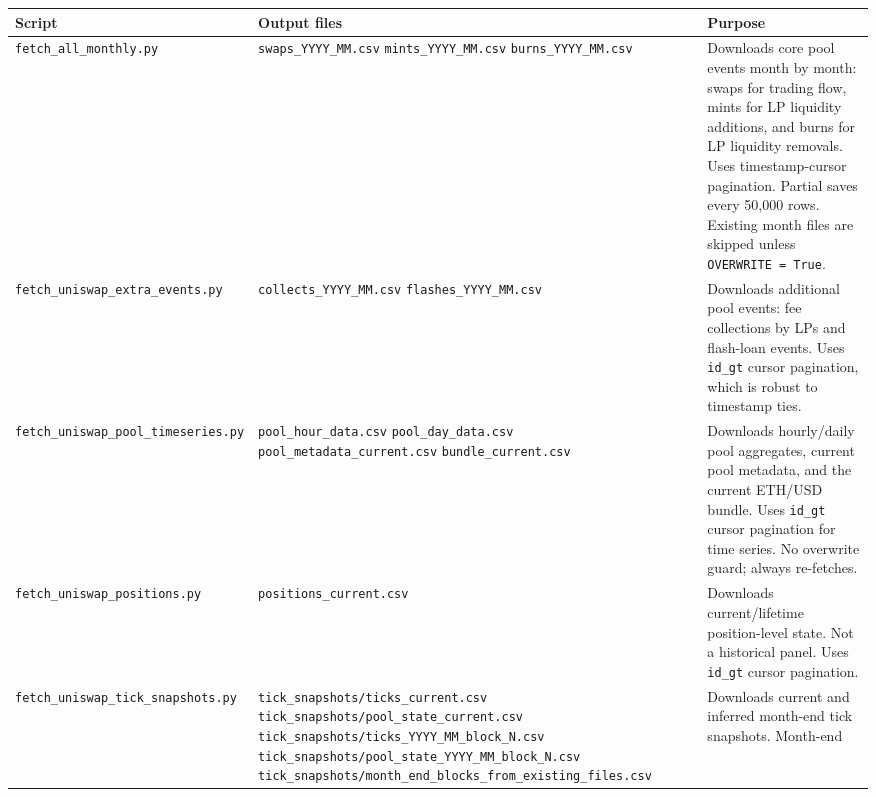 \documentclass[11pt,a4paper]{article}
\begin{document}
\begin{xltabular}{\linewidth}{L{4.5cm}L{4.0cm}Y}
\toprule
\textbf{Script} & \textbf{Output files} & \textbf{Purpose} \\
\midrule
\texttt{fetch\_all\_monthly.py}
  & \texttt{swaps\_YYYY\_MM.csv} \newline
    \texttt{mints\_YYYY\_MM.csv} \newline
    \texttt{burns\_YYYY\_MM.csv}
  & Downloads core pool events month by month: swaps for trading flow,
    mints for LP liquidity additions, and burns for LP liquidity removals.
    Uses timestamp-cursor pagination. Partial saves every 50{,}000 rows.
    Existing month files are skipped unless \texttt{OVERWRITE = True}. \\
\addlinespace
\texttt{fetch\_uniswap\_extra\_events.py}
  & \texttt{collects\_YYYY\_MM.csv} \newline
    \texttt{flashes\_YYYY\_MM.csv}
  & Downloads additional pool events: fee collections by LPs and
    flash-loan events. Uses \texttt{id\_gt} cursor pagination, which
    is robust to timestamp ties. \\
\addlinespace
\texttt{fetch\_uniswap\_pool\_timeseries.py}
  & \texttt{pool\_hour\_data.csv} \newline
    \texttt{pool\_day\_data.csv} \newline
    \texttt{pool\_metadata\_current.csv} \newline
    \texttt{bundle\_current.csv}
  & Downloads hourly/daily pool aggregates, current pool metadata, and
    the current ETH/USD bundle. Uses \texttt{id\_gt} cursor pagination
    for time series. No overwrite guard; always re-fetches. \\
\addlinespace
\texttt{fetch\_uniswap\_positions.py}
  & \texttt{positions\_current.csv}
  & Downloads current/lifetime position-level state. Not a historical
    panel. Uses \texttt{id\_gt} cursor pagination. \\
\addlinespace
\texttt{fetch\_uniswap\_tick\_snapshots.py}
  & \texttt{tick\_snapshots/ticks\_current.csv} \newline
    \texttt{tick\_snapshots/pool\_state\_current.csv} \newline
    \texttt{tick\_snapshots/ticks\_YYYY\_MM\_block\_N.csv} \newline
    \texttt{tick\_snapshots/pool\_state\_YYYY\_MM\_block\_N.csv} \newline
    \texttt{tick\_snapshots/month\_end\_blocks\_from\_existing\_files.csv}
  & Downloads current and inferred month-end tick snapshots. Month-end

\end{xltabular}
\end{document}
